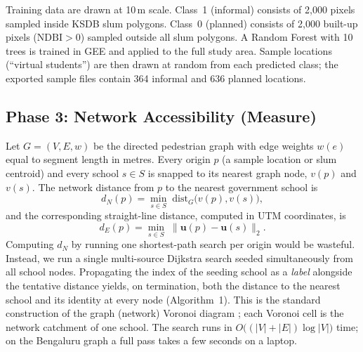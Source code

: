 \documentclass[conference]{IEEEtran}
\newcommand{\m}{\,m}
\begin{document}
Training data are drawn at 10\m{} scale. Class~1 (informal) consists of 2,000 pixels sampled inside KSDB slum polygons. Class~0 (planned) consists of 2,000 built-up pixels ($\mathrm{NDBI}>0$) sampled outside all slum polygons. A Random Forest \cite{breiman2001} with 10 trees is trained in GEE and applied to the full study area. Sample locations (``virtual students'') are then drawn at random from each predicted class; the exported sample files contain 364 informal and 636 planned locations.

\subsection{Phase 3: Network Accessibility (Measure)}
Let $G=(V,E,w)$ be the directed pedestrian graph with edge weights $w(e)$ equal to segment length in metres. Every origin $p$ (a sample location or slum centroid) and every school $s\in S$ is snapped to its nearest graph node, $v(p)$ and $v(s)$. The network distance from $p$ to the nearest government school is
\begin{equation}
d_N(p)=\min_{s\in S}\; \mathrm{dist}_G\big(v(p),v(s)\big),
\end{equation}
and the corresponding straight-line distance, computed in UTM coordinates, is
\begin{equation}
d_E(p)=\min_{s\in S}\; \lVert \mathbf{u}(p)-\mathbf{u}(s)\rVert_2 .
\end{equation}
Computing $d_N$ by running one shortest-path search per origin would be wasteful. Instead, we run a single multi-source Dijkstra search \cite{dijkstra1959} seeded simultaneously from all school nodes. Propagating the index of the seeding school as a \emph{label} alongside the tentative distance yields, on termination, both the distance to the nearest school and its identity at every node (Algorithm~1). This is the standard construction of the graph (network) Voronoi diagram \cite{erwig2000,okabe2008}; each Voronoi cell is the network catchment of one school. The search runs in $O\big((|V|+|E|)\log|V|\big)$ time; on the Bengaluru graph a full pass takes a few seconds on a laptop.
\end{document}
